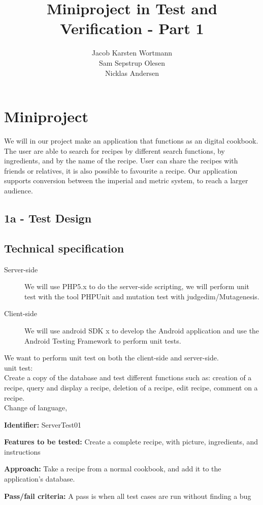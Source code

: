 \documentclass[a4paper,12pt]{memoir}
\title{Miniproject in Test and Verification - Part 1}
\author{Jacob Karsten Wortmann\\Sam Sepstrup Olesen\\Nicklas Andersen}
\newcommand{\testdesign}[4]
{
\begin{framed}
\begin{description}
\item \textbf{Identifier:} #1
\item \textbf{Features to be tested:} #2
\item \textbf{Approach:} #3
\item \textbf{Pass/fail criteria:} #4
\end{description}
\end{framed}
}
\begin{document}
\maketitle
\chapter*{Miniproject}
We will in our project make an application that functions as an digital cookbook. The user are able to search for recipes by different search functions, by ingredients, and by the name of the recipe. User can share the recipes with friends or relatives, it is also possible to favourite a recipe. Our application supports conversion between the imperial and metric system, to reach a larger audience.

\section*{1a - Test Design}
\section{Technical specification}
\begin{description}
    \item[Server-side]
        We will use PHP5.x to do the server-side scripting,
        we will perform unit test with the tool PHPUnit and mutation test with judgedim/Mutagenesis.
    \item[Client-side]
        We will use android SDK x to develop the Android application and use the Android Testing Framework to perform unit tests.
\end{description}

We want to perform unit test on both the client-side and server-side.\\
unit test:\\
Create a copy of the database and test different functions such as: creation of a recipe, query and display a recipe, deletion of a recipe, edit recipe, comment on a recipe.\\
Change of language, 

\testdesign
{ServerTest01} %
{Create a complete recipe, with picture, ingredients, and instructions} %
{Take a recipe from a normal cookbook, and add it to the application's database.} %
{A pass is when all test cases are run without finding a bug} %
\end{document}
